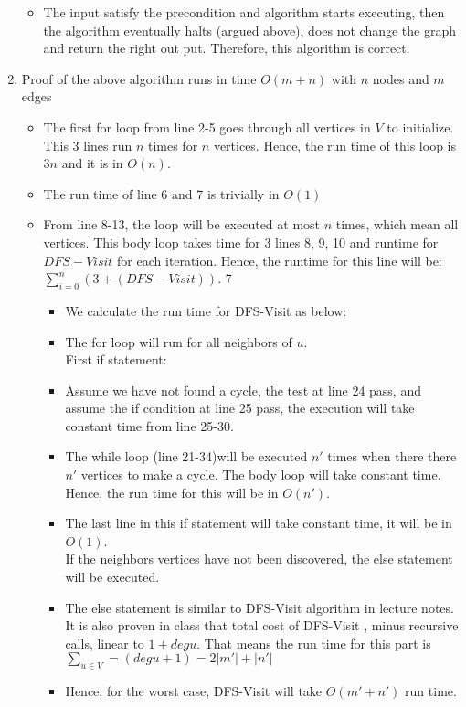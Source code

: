 \documentclass{cpsc413Solutions}
\begin{document}
\begin{problemlist}
\begin{problem}
\begin{answer}
\begin{enumerate}
\begin{itemize}
        \item The input satisfy the precondition and algorithm starts executing, then the algorithm eventually halts (argued above), does not change the graph and return the right out put. Therefore, this algorithm is correct.
        
    \end{itemize}
    
    \item Proof of the above algorithm runs in time ${O}(m+n)$ with $n$ nodes and $m$ edges
     
    \begin{itemize}
        \item The first for loop from line 2-5 goes through all vertices in $V$ to initialize. This 3 lines run $n$ times for $n$ vertices. Hence, the run time of this loop is $3n$ and it is in ${O}(n)$.
        
        \item The run time of line 6 and 7 is trivially in ${O}(1)$
        
        \item From line 8-13, the loop will be executed at most $n$ times, which mean all vertices. This body loop takes time for 3 lines 8, 9, 10 and runtime for $DFS-Visit$ for each iteration. Hence, the runtime for this line will be: $\sum^n_{i=0} (3 + (DFS-Visit))$.
        7\begin{itemize}
            \item We calculate the run time for DFS-Visit as below:
            \item The for loop will run for all neighbors of $u$.\\
            First if statement:
            \item Assume we have not found a cycle, the test at line 24 pass, and assume the if condition at line 25 pass, the execution will take constant time from line 25-30.
            \item The while loop (line 21-34)will be executed $n'$ times when there there $n'$ vertices to make a cycle. The body loop will take constant time. Hence, the run time for this will be in ${O}(n')$.
            \item The last line in this if statement will take constant time, it will be in ${O}(1)$.\\
            If the neighbors vertices have not been discovered, the else statement will be executed.
            \item The else statement is similar to DFS-Visit algorithm in lecture notes. It is also proven in class that total cost of DFS-Visit , minus recursive calls, linear to $1+deg u$. That means the run time for this part is $\sum_{u \in V}= (deg u +1) = 2|m'|+|n'|$
            \item Hence, for the worst case, DFS-Visit will take ${O}(m'+n')$ run time.
        \end{itemize}
        

\end{itemize}
\end{enumerate}
\end{answer}
\end{problem}
\end{problemlist}
\end{document}
